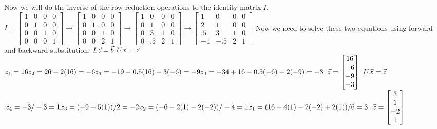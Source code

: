 \documentclass{article}
\begin{document}
Now we will do the inverse of the row reduction operations to the identity matrix $I$.\newline
$I = \begin{bmatrix} 
1 & 0 & 0 & 0\\
0 & 1 & 0 & 0\\
0 & 0 & 1 & 0\\
0 & 0 & 0 & 1
\end{bmatrix} \rightarrow \begin{bmatrix} 
1 & 0 & 0 & 0\\
0 & 1 & 0 & 0\\
0 & 0 & 1 & 0\\
0 & 0 & 2 & 1
\end{bmatrix} \rightarrow \begin{bmatrix} 
1 & 0 & 0 & 0\\
0 & 1 & 0 & 0\\
0 & 3 & 1 & 0\\
0 & .5 & 2 & 1
\end{bmatrix} \rightarrow \begin{bmatrix} 
1 & 0 & 0 & 0\\
2 & 1 & 0 & 0\\
.5 & 3 & 1 & 0\\
-1 & -.5 & 2 & 1
\end{bmatrix}$\newline
Now we need to solve these two equations using forward and backward substitution.\newline
$L\vec{z} = \vec{b}\\$
$U\vec{x} = \vec{z}\\$
$\\z_1 = 16\\
z_2 = 26 - 2(16) = -6\\
z_3 = -19 -0.5(16) - 3(-6) = -9\\
z_4 = -34 + 16 -0.5(-6) - 2(-9) = -3 \\$
$\vec{z} = 
\begin{bmatrix} 
16\\
-6\\
-9\\
-3\end{bmatrix}\\$
$\\U\vec{x} = \vec{z\\}$
$x_4 = -3/-3 = 1\\
x_3 = (-9 + 5(1))/2 = -2\\
x_2 = (-6 -2(1) - 2(-2))/-4 = 1\\
x_1 = (16 - 4(1)-2(-2)+2(1))/6 = 3\\
$
$\vec{x} = 
\begin{bmatrix} 
3\\
1\\
-2\\
1\end{bmatrix}\\$
\end{document}
